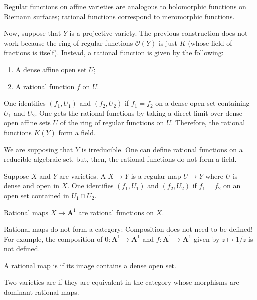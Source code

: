 \documentclass [11 pt, oneside] {article}
\begin{document}
\begin{remark}
	Regular functions on affine varieties are analogous to holomorphic functions on Riemann surfaces; rational functions correspond to meromorphic functions.
\end{remark}

Now, suppose that $Y$ is a projective variety. The previous construction does not work because the ring of regular functions $\mathscr{O}(Y)$ is just $K$ (whose field of fractions is itself). Instead, a rational function is given by the following:
 \begin{enumerate}
	\item A dense affine open set $U$;
	\item A rational function $f$ on $U$.
\end{enumerate}
One identifies $(f_1,U_1)$ and $(f_2,U_2)$ if $f_1=f_2$ on a dense open set containing $U_1$ and $U_2$. One gets the rational functions by taking a direct limit over dense open affine sets $U$ of the ring of regular functions on $U$. Therefore, the rational functions $K(Y)$ form a field.

\begin{remark}
	We are supposing that $Y$ is irreducible. One can define rational functions on a reducible algebraic set, but, then, the rational functions do not form a field.
\end{remark}

Suppose $X$ and $Y$ are varieties. A  $X\longrightarrow Y$ is a regular map $U\longrightarrow Y$ where $U$ is dense and open in $X$. One identifies $(f_1,U_1)$ and $(f_2,U_2)$ if $f_1=f_2$ on an open set contained in $U_1\cap U_2$.

\begin{example}[ ]\label{}
Rational maps $X\longrightarrow \mathbf{A}^1$ are rational functions on $X$.
\end{example}

Rational maps do not form a category: Composition does not need to be defined! For example, the composition of $0:\mathbf{A}^1\longrightarrow \mathbf{A}^1$ and $f:\mathbf{A}^1\longrightarrow \mathbf{A}^1$ given by $z\longmapsto 1/z$ is not defined.

\begin{definition}[ ]\label{}
A rational map is  if its image contains a dense open set.
\end{definition}

\begin{definition}
	Two varieties are  if they are equivalent in the category whose morphisms are dominant rational maps.
\end{definition}
\end{document}
